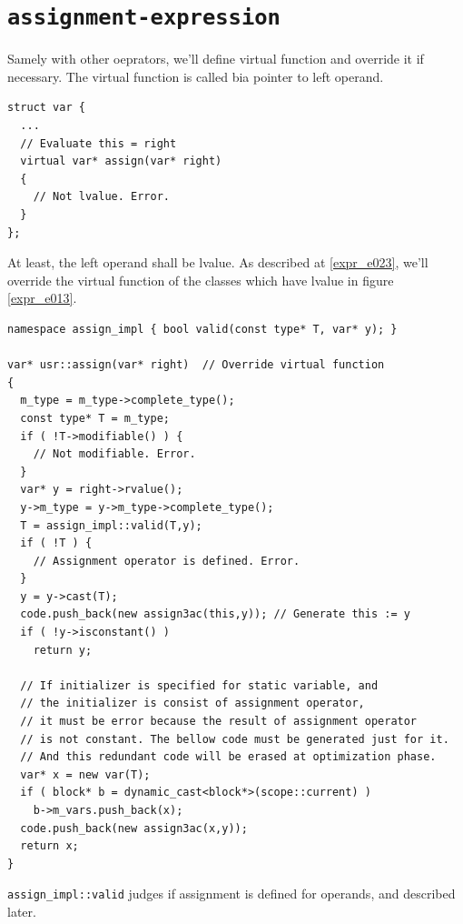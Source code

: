 \section{\tt{assignment-expression}}
\label{expr_e025}

Samely with other oeprators, we'll define virtual function and 
override it if necessary. The virtual function is called bia pointer
to left operand.
\begin{verbatim}
struct var {
  ...
  // Evaluate this = right
  virtual var* assign(var* right)
  {
    // Not lvalue. Error.
  }
};
\end{verbatim}
At least, the left operand shall be lvalue.
As described at \ref{expr_e023}, we'll override the virtual function
of the classes which have lvalue in figure \ref{expr_e013}.
\begin{verbatim}
namespace assign_impl { bool valid(const type* T, var* y); }

var* usr::assign(var* right)  // Override virtual function
{
  m_type = m_type->complete_type();
  const type* T = m_type;
  if ( !T->modifiable() ) {
    // Not modifiable. Error.
  }
  var* y = right->rvalue();
  y->m_type = y->m_type->complete_type();
  T = assign_impl::valid(T,y);
  if ( !T ) {
    // Assignment operator is defined. Error.
  }
  y = y->cast(T);
  code.push_back(new assign3ac(this,y)); // Generate this := y
  if ( !y->isconstant() )
    return y;

  // If initializer is specified for static variable, and
  // the initializer is consist of assignment operator,
  // it must be error because the result of assignment operator
  // is not constant. The bellow code must be generated just for it.
  // And this redundant code will be erased at optimization phase.
  var* x = new var(T);
  if ( block* b = dynamic_cast<block*>(scope::current) )
    b->m_vars.push_back(x);
  code.push_back(new assign3ac(x,y));
  return x;
}
\end{verbatim}
{\tt{assign\_impl::valid}} judges if assignment is defined for operands,
and described later.

